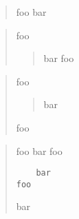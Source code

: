 
\def\mytitle{Blockquotes}


\begin{quote}
foo
bar
\end{quote}

\begin{quote}
foo

\begin{quote}
bar
foo
\end{quote}
\end{quote}

\begin{quote}
foo

\begin{quote}
bar
\end{quote}

foo
\end{quote}

\begin{quote}
foo
bar
 foo

\begin{verbatim}
	bar
foo
\end{verbatim}

bar
\end{quote}



